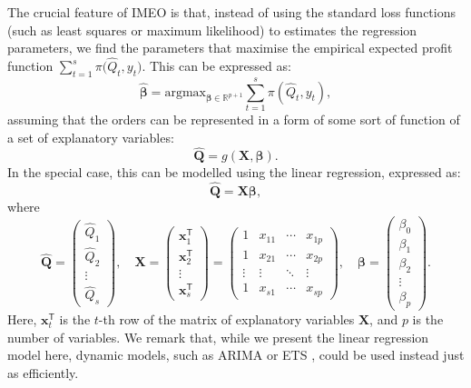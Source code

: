 \documentclass{article}
\begin{document}
The crucial feature of IMEO is that, instead of using the standard loss functions (such as least squares or maximum likelihood) to estimates the regression parameters, we find the parameters that maximise the empirical expected profit function $\sum_{t=1}^s{\pi \big( \hat{Q}_t,y_t \big)}$. This can be expressed as:
\[
    \hat{\boldsymbol{\beta}}=\text{argmax}_{\boldsymbol{\beta}\in \mathbb{R}^{p+1}}\displaystyle\sum_{t=1}^s{\pi(\hat{Q}_t,y_t)},
\]
assuming that the orders can be represented in a form of some sort of function of a set of explanatory variables:
\[
    \mathbf{\hat{Q}}=g\left(\mathbf{X},\boldsymbol{\beta}\right).
\]
In the special case, this can be modelled using the linear regression, expressed as:
\[
    \mathbf{\hat{Q}}=\mathbf{X}\boldsymbol{\beta},
\]
where
\[
    \mathbf{\hat{Q}}=
    \begin{pmatrix}
        \hat{Q}_1\\
        \hat{Q}_2\\
        \vdots\\
        \hat{Q}_s
    \end{pmatrix}, \quad
    \mathbf{X}=
    \begin{pmatrix}
        \mathbf{x}_1^{\mathsf{T}}\\
        \mathbf{x}_2^{\mathsf{T}}\\
        \vdots\\
        \mathbf{x}_s^{\mathsf{T}}
    \end{pmatrix}=
    \begin{pmatrix}
        1&x_{11}&\cdots &x_{1p}\\
        1&x_{21}&\cdots &x_{2p}\\
        \vdots &\vdots &\ddots &\vdots \\
        1&x_{s1}&\cdots &x_{sp}
    \end{pmatrix}, \quad
    \boldsymbol{\beta}=
    \begin{pmatrix}
        \beta_0\\
        \beta_1\\
        \beta_2\\
        \vdots\\
        \beta_{p}
    \end{pmatrix}.
\]
Here, $\mathbf{x}_t^{\mathsf{T}}$ is the $t$-th row of the matrix of explanatory variables $\mathbf{X}$, and $p$ is the number of variables. We remark that, while we present the linear regression model here, dynamic models, such as ARIMA \cite{Box76} or ETS \cite{Hy08}, could be used instead just as efficiently.
\end{document}

